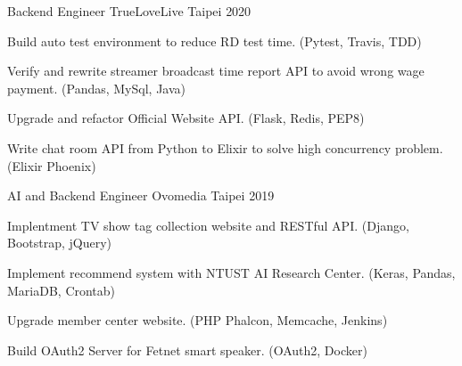 

\begin{cventries}

  \cventry
    {Backend Engineer} %
    {TrueLoveLive} %
    {Taipei} %
    {2020} %
    {
      \begin{cvitems} %
        \item {Build auto test environment to reduce RD test time. (Pytest, Travis, TDD)}
        \item {Verify and rewrite streamer broadcast time report API to avoid wrong wage payment. (Pandas, MySql, Java)}
        \item {Upgrade and refactor Official Website API. (Flask, Redis, PEP8)}
        \item {Write chat room API from Python to Elixir to solve high concurrency problem. (Elixir Phoenix)}
      \end{cvitems}
    }

  \cventry
    {AI and Backend Engineer} %
    {Ovomedia} %
    {Taipei} %
    {2019} %
    {
      \begin{cvitems} %
        \item {Implentment TV show tag collection website and RESTful API. (Django, Bootstrap, jQuery)}
        \item {Implement recommend system with NTUST AI Research Center. (Keras, Pandas, MariaDB, Crontab)}
        \item {Upgrade member center website. (PHP Phalcon, Memcache, Jenkins)}
        \item {Build OAuth2 Server for Fetnet smart speaker. (OAuth2, Docker)}
      \end{cvitems}
    }

\end{cventries}
